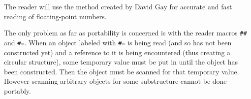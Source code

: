 The reader will use the method created by David Gay for accurate and
fast reading of floating-point numbers. 

The only problem as far as portability is concerned is with the reader
macros \texttt{\#\#} and \texttt{\#=}.  When an object labeled with
\texttt{\#=} is being read (and so has not been constructed yet) and a
reference to it is being encountered (thus creating a circular
structure), some temporary value must be put in until the object has
been constructed.  Then the object must be scanned for that temporary
value.  However scanning arbitrary objects for some substructure
cannot be done portably.


